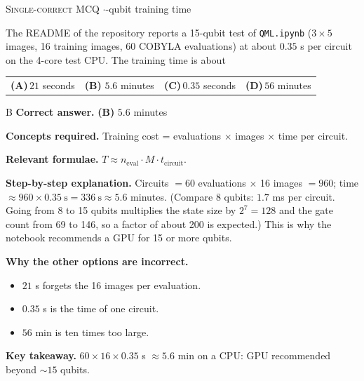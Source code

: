 \documentclass[11pt,a4paper]{article}
\newcommand{\optlabel}[1]{\textbf{(#1)}}
\newcommand{\correctlabel}[1]{\textcolor{okgreen}{\textbf{(#1)}\,\ding{51}}}
\newenvironment{qitem}[1]{\begin{list}{}{\setlength{\leftmargin}{3.3em}\setlength{\labelwidth}{3.1em}%
  \setlength{\labelsep}{0.2em}\setlength{\topsep}{3pt}\setlength{\parsep}{3pt}}\item[\textbf{Q.#1}\hfill]}{\end{list}}
\newcommand{\qsep}{\par\vspace{2pt}{\color{black!15}\hrule}\vspace{4pt}}
\newcommand{\qmeta}[2]{{\footnotesize\color{black!60}\textsc{#1} \;$\cdot$\; #2}\par}
\begin{document}
\begin{qitem}{69}
\qmeta{Single-correct MCQ}{15-qubit training time}
The README of the repository reports a 15-qubit test of \texttt{QML.ipynb} ($3\times5$ images, 16 training images, 60 COBYLA
evaluations) at about $0.35$ s per circuit on the 4-core test CPU. The training time is about
\par\smallskip\noindent\begin{tabularx}{\linewidth}{@{}*{4}{L}@{}}
\optlabel{A}\,$21$ seconds & \correctlabel{B}\,$5.6$ minutes & \optlabel{C}\,$0.35$ seconds & \optlabel{D}\,$56$ minutes
\end{tabularx}
\end{qitem}
\begin{solbox}{B}
\textbf{\color{brand}Correct answer.} \textcolor{okgreen}{\textbf{(B)}} $5.6$ minutes

\textbf{\color{brand}Concepts required.} Training cost = evaluations $\times$ images $\times$ time per circuit.

\textbf{\color{brand}Relevant formulae.} $T \approx n_{\text{eval}}\cdot M\cdot t_{\text{circuit}}$.

\textbf{\color{brand}Step-by-step explanation.} Circuits $= 60$ evaluations $\times$ 16 images $= 960$; time $\approx 960\times0.35\ \text{s} = 336\ \text{s} \approx 5.6$ minutes.
(Compare 8 qubits: $1.7$ ms per circuit. Going from 8 to 15 qubits multiplies the state size by $2^7 = 128$ and the gate count from
69 to 146, so a factor of about 200 is expected.) This is why the notebook recommends a GPU for 15 or more qubits.

\textbf{\color{brand}Why the other options are incorrect.}
\begin{itemize}[leftmargin=2.4em, itemsep=1pt, topsep=2pt]
\item[\textbf{(A)}] $21$ s forgets the 16 images per evaluation.
\item[\textbf{(C)}] $0.35$ s is the time of one circuit.
\item[\textbf{(D)}] $56$ min is ten times too large.
\end{itemize}
\textbf{\color{brand}Key takeaway.} $60\times16\times0.35$ s $\approx 5.6$ min on a CPU: GPU recommended beyond $\sim15$ qubits.
\end{solbox}
\qsep
\end{document}
